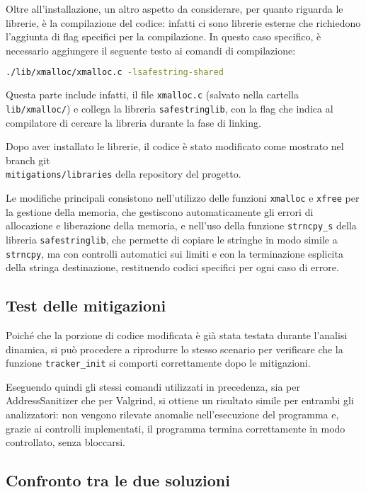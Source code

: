 \medskip
Oltre all'installazione, un altro aspetto da considerare, per quanto riguarda le
librerie, è la compilazione del codice: infatti ci sono librerie esterne che richiedono
l'aggiunta di flag specifici per la compilazione. In questo caso specifico, è necessario
aggiungere il seguente testo ai comandi di compilazione:
\begin{lstlisting}[language=bash, numbers=none]
./lib/xmalloc/xmalloc.c -lsafestring-shared
\end{lstlisting}
Questa parte include infatti, il file \texttt{xmalloc.c} (salvato nella cartella
\texttt{lib/xmalloc/}) e collega la libreria \texttt{safestringlib}, con la flag
che indica al compilatore di cercare la libreria durante la fase di linking.

Dopo aver installato le librerie, il codice è stato modificato come mostrato nel
branch git \\ \texttt{mitigations/libraries} della repository del progetto.

Le modifiche principali consistono nell'utilizzo delle funzioni \texttt{xmalloc}
e \texttt{xfree} per la gestione della memoria, che gestiscono automaticamente
gli errori di allocazione e liberazione della memoria, e nell'uso della funzione
\texttt{strncpy\_s} della libreria \texttt{safestringlib}, che permette di
copiare le stringhe in modo simile a \texttt{strncpy}, ma con controlli
automatici sui limiti e con la terminazione esplicita della stringa destinazione,
restituendo codici specifici per ogni caso di errore.

\subsection*{Test delle mitigazioni}
\label{sec:test-mitigations}

Poiché che la porzione di codice modificata è già stata testata durante l'analisi
dinamica, si può procedere a riprodurre lo stesso scenario per verificare che la
funzione \texttt{tracker\_init} si comporti correttamente dopo le mitigazioni.

Eseguendo quindi gli stessi comandi utilizzati in precedenza, sia per AddressSanitizer
che per Valgrind, si ottiene un risultato simile per entrambi gli analizzatori: non
vengono rilevate anomalie nell'esecuzione del programma e, grazie ai controlli
implementati, il programma termina correttamente in modo controllato, senza
bloccarsi.

\subsection*{Confronto tra le due soluzioni}
\label{sec:comparison-case-study}

